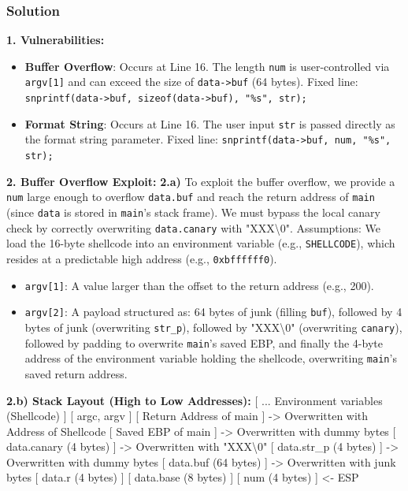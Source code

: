 \documentclass{article}
\begin{document}
\subsubsection*{Solution}
\textbf{1. Vulnerabilities:}
\begin{itemize}
    \item \textbf{Buffer Overflow}: Occurs at Line 16. The length \texttt{num} is user-controlled via \texttt{argv[1]} and can exceed the size of \texttt{data->buf} (64 bytes). Fixed line: \texttt{snprintf(data->buf, sizeof(data->buf), "\%s", str);}
    \item \textbf{Format String}: Occurs at Line 16. The user input \texttt{str} is passed directly as the format string parameter. Fixed line: \texttt{snprintf(data->buf, num, "\%s", str);}

\end{itemize}
\textbf{2. Buffer Overflow Exploit:}
\textbf{2.a)} To exploit the buffer overflow, we provide a \texttt{num} large enough to overflow \texttt{data.buf} and reach the return address of \texttt{main} (since \texttt{data} is stored in \texttt{main}'s stack frame). We must bypass the local canary check by correctly overwriting \texttt{data.canary} with "XXX\textbackslash{}0".
Assumptions: We load the 16-byte shellcode into an environment variable (e.g., \texttt{SHELLCODE}), which resides at a predictable high address (e.g., \texttt{0xbffffff0}).
\begin{itemize}
    \item \texttt{argv[1]}: A value larger than the offset to the return address (e.g., 200).
    \item \texttt{argv[2]}: A payload structured as: 64 bytes of junk (filling \texttt{buf}), followed by 4 bytes of junk (overwriting \texttt{str\_p}), followed by "XXX\textbackslash{}0" (overwriting \texttt{canary}), followed by padding to overwrite \texttt{main}'s saved EBP, and finally the 4-byte address of the environment variable holding the shellcode, overwriting \texttt{main}'s saved return address.

\end{itemize}
\textbf{2.b) Stack Layout (High to Low Addresses):}
[ ... Environment variables (Shellcode) ]
[ argc, argv ]
[ Return Address of main ] -> Overwritten with Address of Shellcode
[ Saved EBP of main ] -> Overwritten with dummy bytes
[ data.canary (4 bytes) ] -> Overwritten with "XXX\textbackslash{}0"
[ data.str\_p (4 bytes) ] -> Overwritten with dummy bytes
[ data.buf (64 bytes) ] -> Overwritten with junk bytes
[ data.r (4 bytes) ]
[ data.base (8 bytes) ]
[ num (4 bytes) ]
<- ESP
\end{document}
